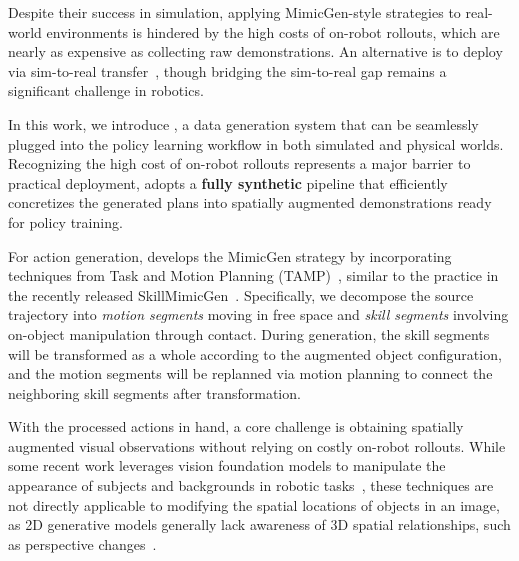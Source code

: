 Despite their success in simulation, applying MimicGen-style strategies to real-world environments is hindered by the high costs of on-robot rollouts, which are nearly as expensive as collecting raw demonstrations. An alternative is to deploy via sim-to-real transfer~\cite{peng2018sim,torne2024reconciling,yuan2024learning}, though bridging the sim-to-real gap remains a significant challenge in robotics.

\vspace{0.2cm}   
In this work, we introduce \method, a data generation system that can be seamlessly plugged into the policy learning workflow in both simulated and physical worlds.
Recognizing the high cost of on-robot rollouts represents a major barrier to practical deployment, \method adopts a \textbf{fully synthetic} pipeline that efficiently concretizes the generated plans into spatially augmented demonstrations ready for policy training.

For action generation, \method develops the MimicGen strategy by incorporating techniques from Task and Motion Planning (TAMP)~\cite{dalal2023imitating,cheng2023nod,mandlekar2023human}, similar to the practice in the recently released SkillMimicGen~\cite{garrett2024skillmimicgen}.
Specifically, we decompose the source trajectory into \textit{motion segments} moving in free space and \textit{skill segments} involving on-object manipulation through contact. During generation, the skill segments will be transformed as a whole according to the augmented object configuration, and the motion segments will be replanned via motion planning to connect the neighboring skill segments after transformation.


With the processed actions in hand, a core challenge is obtaining spatially augmented visual observations without relying on costly on-robot rollouts. While some recent work leverages vision foundation models to manipulate the appearance of subjects and backgrounds in robotic tasks~\cite{yu2023scaling,chen2023genaug,chen2024mirage}, these techniques are not directly applicable to modifying the spatial locations of objects in an image, as 2D generative models generally lack awareness of 3D spatial relationships, such as perspective changes~\cite{xu20223d}.

